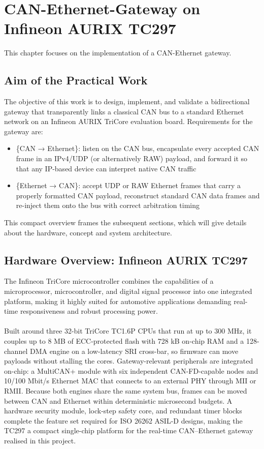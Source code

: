 \newpage 
\section{CAN-Ethernet-Gateway on Infineon AURIX TC297}\label{sec:can-gateway}

This chapter focuses on the implementation of a CAN-Ethernet gateway.

\subsection{Aim of the Practical Work}
The objective of this work is to design, implement, and validate a bidirectional gateway that transparently links a classical CAN bus to a standard Ethernet network on an Infineon AURIX TriCore evaluation board. Requirements for the gateway are:
\begin{itemize}
\item \{CAN → Ethernet\}: listen on the CAN bus, encapsulate every accepted CAN frame in an IPv4/UDP (or alternatively RAW) payload, and forward it so that any IP-based device can interpret native CAN traffic
\item \{Ethernet → CAN\}: accept UDP or RAW Ethernet frames that carry a properly formatted CAN payload, reconstruct standard CAN data frames and re-inject them onto the bus with correct arbitration timing
\end{itemize}
This compact overview frames the subsequent sections, which will give details about the hardware, concept and system architecture. 
\subsection{Hardware Overview: Infineon AURIX TC297}
The Infineon TriCore microcontroller combines the capabilities of a microprocessor, microcontroller, and digital signal processor into one integrated platform, making it highly suited for automotive applications demanding real-time responsiveness and robust processing power.\\\\
Built around three 32-bit TriCore TC1.6P CPUs that run at up to 300 MHz, it couples up to 8 MB of ECC-protected flash with 728 kB on-chip RAM and a 128-channel DMA engine on a low-latency SRI cross-bar, so firmware can move payloads without stalling the cores. Gateway-relevant peripherals are integrated on-chip: a MultiCAN+ module with six independent CAN-FD-capable nodes and 10/100 Mbit/s Ethernet MAC that connects to an external PHY through MII or RMII. Because both engines share the same system bus, frames can be moved between CAN and Ethernet within deterministic microsecond budgets. A hardware security module, lock-step safety core, and redundant timer blocks complete the feature set required for ISO 26262 ASIL-D designs, making the TC297 a compact single-chip platform for the real-time CAN–Ethernet gateway realised in this project\cite{infineon}.

